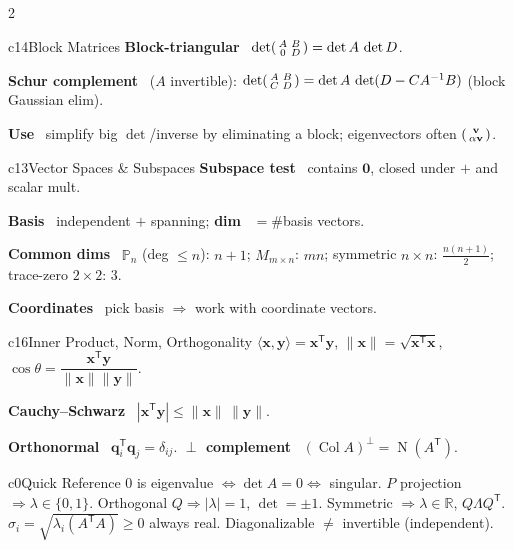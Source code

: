 \documentclass[10pt]{extarticle}
\newcommand{\h}[1]{{\bfseries #1}\ }
\newcommand{\R}{\mathbb{R}}
\newcommand{\T}{^{\mathsf T}}
\newcommand{\Col}{\operatorname{Col}}
\newcommand{\Nul}{\operatorname{N}}
\newcommand{\bv}{\mathbf{v}}
\newcommand{\bx}{\mathbf{x}}
\newcommand{\bq}{\mathbf{q}}
\begin{document}
\begin{multicols}{2}
\begin{tbox}{c14}{Block Matrices}
\h{Block-triangular} $\det\begin{psmallmatrix}A&B\\0&D\end{psmallmatrix}=\det A\,\det D$.\par
\h{Schur complement} ($A$ invertible): $\det\begin{psmallmatrix}A&B\\C&D\end{psmallmatrix}=\det A\,\det(D-CA^{-1}B)$ (block Gaussian elim).\par
\h{Use} simplify big $\det$/inverse by eliminating a block; eigenvectors often $\begin{psmallmatrix}\bv\\ \alpha\bv\end{psmallmatrix}$.
\end{tbox}

\begin{tbox}{c13}{Vector Spaces \& Subspaces}
\h{Subspace test} contains $\mathbf0$, closed under $+$ and scalar mult.\par
\h{Basis} independent $+$ spanning; \h{dim} $=\#$basis vectors.\par
\h{Common dims} $\mathbb P_n$ (deg $\le n$): $n{+}1$; $M_{m\times n}$: $mn$; symmetric $n{\times}n$: $\tfrac{n(n+1)}2$; trace-zero $2{\times}2$: $3$.\par
\h{Coordinates} pick basis $\Rightarrow$ work with coordinate vectors.
\end{tbox}

\begin{tbox}{c16}{Inner Product, Norm, Orthogonality}
$\langle\bx,\mathbf y\rangle=\bx\T\mathbf y$, $\|\bx\|=\sqrt{\bx\T\bx}$, $\cos\theta=\dfrac{\bx\T\mathbf y}{\|\bx\|\|\mathbf y\|}$.\par
\h{Cauchy--Schwarz} $|\bx\T\mathbf y|\le\|\bx\|\,\|\mathbf y\|$.\par
\h{Orthonormal} $\bq_i\T\bq_j=\delta_{ij}$. \h{$\perp$ complement} $(\Col A)^{\perp}=\Nul(A\T)$.
\end{tbox}

\begin{tbox}{c0}{Quick Reference}
\footnotesize
$0$ is eigenvalue $\iff\det A{=}0\iff$ singular.\;
$P$ projection $\Rightarrow\lambda\in\{0,1\}$.\;
Orthogonal $Q\Rightarrow|\lambda|{=}1$, $\det{=}{\pm}1$.\;
Symmetric $\Rightarrow\lambda\in\R$, $Q\Lambda Q\T$.\;
$\sigma_i{=}\sqrt{\lambda_i(A\T A)}\ge0$ always real.\;
Diagonalizable $\neq$ invertible (independent).
\end{tbox}


\end{multicols}
\end{document}
